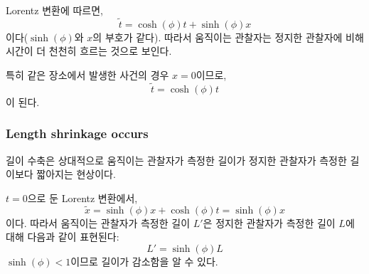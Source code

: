 \documentclass[10pt,a4paper]{article}
\begin{document}
Lorentz 변환에 따르면,
\begin{equation*}
\tilde{t} = \cosh(\phi) t + \sinh(\phi) x
\end{equation*}
이다($\sinh(\phi)$와 $x$의 부호가 같다). 따라서 움직이는 관찰자는 정지한 관찰자에 비해 시간이 더 천천히 흐르는 것으로 보인다.

특히 같은 장소에서 발생한 사건의 경우 $x = 0$이므로,
\begin{equation*}
\tilde{t} = \cosh(\phi)t
\end{equation*}
이 된다.

\subsubsection{Length shrinkage occurs}
길이 수축은 상대적으로 움직이는 관찰자가 측정한 길이가 정지한 관찰자가 측정한 길이보다 짧아지는 현상이다.

$t = 0$으로 둔 Lorentz 변환에서,
\begin{equation*}
\tilde{x} = \sinh(\phi) x + \cosh(\phi) t = \sinh(\phi) x
\end{equation*}
이다. 따라서 움직이는 관찰자가 측정한 길이 $L'$은 정지한 관찰자가 측정한 길이 $L$에 대해 다음과 같이 표현된다:
\begin{equation*}
L' = \sinh(\phi)L
\end{equation*}
$\sinh(\phi) < 1$이므로 길이가 감소함을 알 수 있다.
\newpage
\nocite{*}


\end{document}
